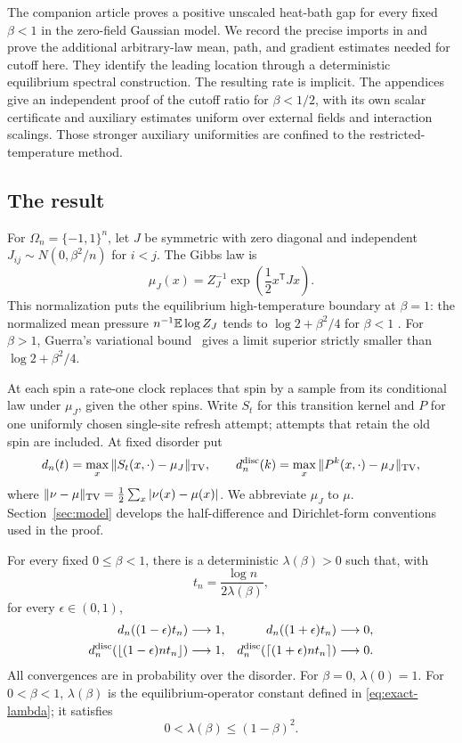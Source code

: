 The companion article \cite{SKGap} proves a positive unscaled heat-bath
gap for every fixed \(\beta<1\) in the zero-field Gaussian model.
We record the precise imports in  and prove the
additional arbitrary-law mean, path, and gradient estimates needed for
cutoff here.  They identify the leading location through a deterministic
equilibrium spectral construction.  The resulting rate is implicit.
The appendices give an independent proof of the cutoff ratio for
\(\beta<1/2\), with its own scalar certificate and auxiliary estimates
uniform over external fields and interaction scalings.  Those stronger auxiliary uniformities
are confined to the restricted-temperature method.

\subsection{The result}

For \(\Omega_n=\{-1,1\}^n\), let \(J\) be symmetric with zero diagonal
and independent \(J_{ij}\sim N(0,\beta^2/n)\) for \(i<j\). The Gibbs law is
\[
 \mu_J(x)=Z_J^{-1}\exp\!\left(\frac12x^{\mathsf T}Jx\right).
\]
This normalization puts the equilibrium high-temperature boundary at
\(\beta=1\): the normalized mean pressure \(n^{-1}\mathbb E\log Z_J\)
tends to \(\log2+\beta^2/4\) for \(\beta<1\)
\cite[Proposition~2.1]{ALR1987}. For \(\beta>1\), Guerra's
variational bound~\cite{Guerra2003} gives a limit superior strictly
smaller than \(\log2+\beta^2/4\).

At each spin a rate-one clock replaces that spin by a sample from its
conditional law under \(\mu_J\), given the other spins. Write \(S_t\)
for this transition kernel and \(P\) for one uniformly chosen single-site
refresh attempt; attempts that retain the old spin are included.
At fixed disorder put
\[
 d_n(t)=\max_x\|S_t(x,\cdot)-\mu_J\|_{\operatorname{TV}},\qquad
 d_n^{\rm disc}(k)=\max_x\|P^k(x,\cdot)-\mu_J\|_{\operatorname{TV}},
\]
where \(\|\nu-\mu\|_{\operatorname{TV}}=\frac12\sum_x|\nu(x)-\mu(x)|\).
We abbreviate \(\mu_J\) to \(\mu\). Section~\ref{sec:model} develops the
half-difference and Dirichlet-form conventions used in the proof.

\begin{theorem}
\label{thm:main}
For every fixed \(0\leq\beta<1\), there is a deterministic
\(\lambda(\beta)>0\) such that, with
\[
 t_n=\frac{\log n}{2\lambda(\beta)},
\]
for every \(\epsilon\in(0,1)\),
\begin{align*}
 d_n((1-\epsilon)t_n)&\longrightarrow1,
 &
 d_n((1+\epsilon)t_n)&\longrightarrow0,\\
 d_n^{\rm disc}(\lfloor(1-\epsilon)nt_n\rfloor)&\longrightarrow1,
 &
 d_n^{\rm disc}(\lceil(1+\epsilon)nt_n\rceil)&\longrightarrow0.
\end{align*}
All convergences are in probability over the disorder.
For \(\beta=0\), \(\lambda(0)=1\).
For \(0<\beta<1\), \(\lambda(\beta)\) is the equilibrium-operator
constant defined in \eqref{eq:exact-lambda}; it satisfies
\[
 0<\lambda(\beta)\leq(1-\beta)^2.
\]
\end{theorem}

